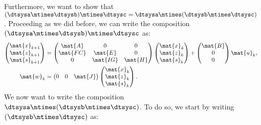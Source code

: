 Furthermore, we want to show that~$(\dtsysa\mtimes \dtsysb)\mtimes \dtsysc=\dtsysa\mtimes (\dtsysb\mtimes \dtsysc)$.
Proceeding as we did before, we can write the composition~$(\dtsysa\mtimes \dtsysb)\mtimes \dtsysc$ as:
\begin{equation*}
	\label{eq:dlin-5}
	\begin{aligned}
		\begin{pmatrix}
			\mat{x}_{k+1} \\
			\mat{z}_{k+1} \\
			\mat{s}_{k+1}
		\end{pmatrix} & =
		\begin{pmatrix}
			\mat{A}  & 0        & 0       \\
			\mat{FC} & \mat{E}  & 0       \\
			0        & \mat{IG} & \mat{H}
		\end{pmatrix}\begin{pmatrix}
			\mat{x}_k \\ \mat{z}_k\\ \mat{s}_k
		\end{pmatrix}+
		\begin{pmatrix}
			\mat{B} \\ 0\\ 0
		\end{pmatrix}\mat{u}_k,                                                \\
		\mat{w}_k                  & =\begin{pmatrix}
			0 & 0 & \mat{J}
		\end{pmatrix}\begin{pmatrix}
			\mat{x}_k \\ \mat{z}_k\\ \mat{s}_k
		\end{pmatrix}.
	\end{aligned}
\end{equation*}
We now want to write the composition~$\dtsysa\mtimes (\dtsysb\mtimes \dtsysc)$.
To do so, we start by writing~$(\dtsysb\mtimes \dtsysc)$ as:
